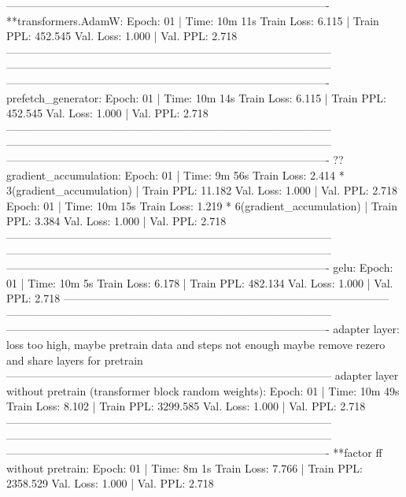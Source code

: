 \documentclass[letterpaper]{article} %
\begin{document}
\begin{CJK*}{UTF8}{gbsn}
----------------------------------------------------------------------------------------
**transformers.AdamW:
Epoch: 01 | Time: 10m 11s
	Train Loss: 6.115 | Train PPL: 452.545
	 Val. Loss: 1.000 |  Val. PPL:   2.718
-----------------------------------------------------------------------------------------
-----------------------------------------------------------------------------------------
----------------------------------------------------------------------------------------
prefetch_generator:
Epoch: 01 | Time: 10m 14s
	Train Loss: 6.115 | Train PPL: 452.545
	 Val. Loss: 1.000 |  Val. PPL:   2.718
-----------------------------------------------------------------------------------------
-----------------------------------------------------------------------------------------
----------------------------------------------------------------------------------------
??gradient_accumulation:
Epoch: 01 | Time: 9m 56s
	Train Loss: 2.414 * 3(gradient_accumulation) | Train PPL:  11.182
	 Val. Loss: 1.000 |  Val. PPL:   2.718
Epoch: 01 | Time: 10m 15s
        Train Loss: 1.219 * 6(gradient_accumulation) | Train PPL:   3.384
	 Val. Loss: 1.000 |  Val. PPL:   2.718
-----------------------------------------------------------------------------------------
-----------------------------------------------------------------------------------------
----------------------------------------------------------------------------------------
gelu:
Epoch: 01 | Time: 10m 5s
	Train Loss: 6.178 | Train PPL: 482.134
	 Val. Loss: 1.000 |  Val. PPL:   2.718
-----------------------------------------------------------------------------------------
-----------------------------------------------------------------------------------------
----------------------------------------------------------------------------------------
adapter layer:
loss too high, maybe pretrain data and steps not enough
maybe remove rezero and share layers for pretrain
-----------------------------------------------------------------------------------------
adapter layer without pretrain (transformer block random weights):
Epoch: 01 | Time: 10m 49s
	Train Loss: 8.102 | Train PPL: 3299.585
	 Val. Loss: 1.000 |  Val. PPL:   2.718
-----------------------------------------------------------------------------------------
-----------------------------------------------------------------------------------------
----------------------------------------------------------------------------------------
**factor ff without pretrain:
Epoch: 01 | Time: 8m 1s
	Train Loss: 7.766 | Train PPL: 2358.529
	 Val. Loss: 1.000 |  Val. PPL:   2.718

\end{CJK*}
\end{document}
